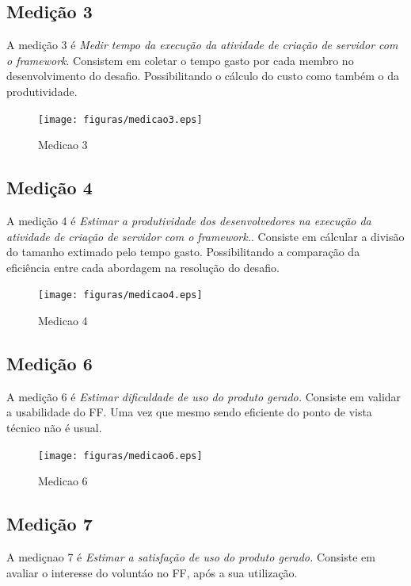 \subsection{Medição 3}

A medição 3 é \textit{Medir tempo da execução da atividade de criação de servidor com o framework}. Consistem em
coletar o tempo gasto por cada membro no desenvolvimento do desafio. Possibilitando o cálculo do custo como também
o da produtividade.

\begin{figure}[H]
  \centering
  \label{fig:indicadores}
  \texttt{[image: figuras/medicao3.eps]}
  \caption{Medicao 3}
\end{figure}

\subsection{Medição 4}

A medição 4 é \textit{Estimar a produtividade dos desenvolvedores na execução da atividade de criação de servidor com o framework.}. Consiste
em cálcular a divisão do tamanho extimado pelo tempo gasto. Possibilitando a comparação da eficiência entre cada abordagem
na resolução do desafio.

\begin{figure}[H]
  \centering
  \label{fig:indicadores}
  \texttt{[image: figuras/medicao4.eps]}
  \caption{Medicao 4}
\end{figure}

\subsection{Medição 6}

A medição 6 é \textit{Estimar dificuldade de uso do produto gerado.} Consiste em validar a usabilidade do FF. Uma vez que
mesmo sendo eficiente do ponto de vista técnico não é usual.

\begin{figure}[H]
  \centering
  \label{fig:indicadores}
  \texttt{[image: figuras/medicao6.eps]}
  \caption{Medicao 6}
\end{figure}

\subsection{Medição 7}

A mediçnao 7 é \textit{Estimar a satisfação de uso do produto gerado.} Consiste em avaliar o interesse do voluntáo no FF, após
a sua utilização.

